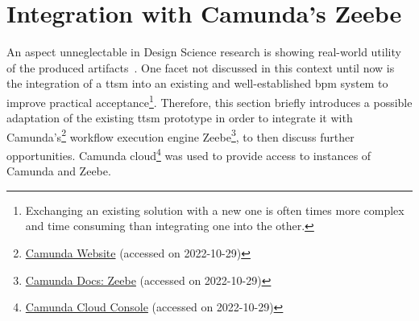 


\section{Integration with Camunda's Zeebe}
\label{sec:evaluation:integration}
An aspect unneglectable in Design Science research is showing real-world utility of the produced artifacts~\cite{hevner2004_design_science}. One facet not discussed in this context until now is the integration of a \gls{ttsm} into an existing and well-established \gls{bpm} system to improve practical acceptance\footnote{Exchanging an existing solution with a new one is often times more complex and time consuming than integrating one into the other.}. Therefore, this section briefly introduces a possible adaptation of the existing \gls{ttsm} prototype in order to integrate it with Camunda's\footnote{\href{https://camunda.com/}{Camunda Website} (accessed on 2022-10-29)} workflow execution engine Zeebe\footnote{\href{https://docs.camunda.io/docs/components/zeebe/zeebe-overview/}{Camunda Docs: Zeebe} (accessed on 2022-10-29)}, to then discuss further opportunities. Camunda cloud\footnote{\href{https://console.cloud.camunda.io/}{Camunda Cloud Console} (accessed on 2022-10-29)} was used to provide access to instances of Camunda and Zeebe.


